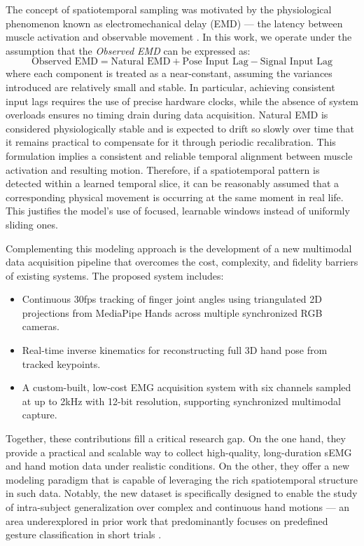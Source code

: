 The concept of spatiotemporal sampling was motivated by the physiological phenomenon known as electromechanical delay (EMD) — the latency between muscle activation and observable movement \cite{ngeo2014continuous}. In this work, we operate under the assumption that the \textit{Observed EMD} can be expressed as:
\[
\text{Observed EMD} = \text{Natural EMD} + \text{Pose Input Lag} - \text{Signal Input Lag}
\]
where each component is treated as a near-constant, assuming the variances introduced are relatively small and stable. In particular, achieving consistent input lags requires the use of precise hardware clocks, while the absence of system overloads ensures no timing drain during data acquisition. Natural EMD is considered physiologically stable and is expected to drift so slowly over time that it remains practical to compensate for it through periodic recalibration. This formulation implies a consistent and reliable temporal alignment between muscle activation and resulting motion. Therefore, if a spatiotemporal pattern is detected within a learned temporal slice, it can be reasonably assumed that a corresponding physical movement is occurring at the same moment in real life. This justifies the model's use of focused, learnable windows instead of uniformly sliding ones.

Complementing this modeling approach is the development of a new multimodal data acquisition pipeline that overcomes the cost, complexity, and fidelity barriers of existing systems. The proposed system includes:
\begin{itemize}
    \item Continuous 30fps tracking of finger joint angles using triangulated 2D projections from MediaPipe Hands across multiple synchronized RGB cameras.
    \item Real-time inverse kinematics for reconstructing full 3D hand pose from tracked keypoints.
    \item A custom-built, low-cost EMG acquisition system with six channels sampled at up to 2kHz with 12-bit resolution, supporting synchronized multimodal capture.
\end{itemize}

Together, these contributions fill a critical research gap. On the one hand, they provide a practical and scalable way to collect high-quality, long-duration sEMG and hand motion data under realistic conditions. On the other, they offer a new modeling paradigm that is capable of leveraging the rich spatiotemporal structure in such data. Notably, the new dataset is specifically designed to enable the study of intra-subject generalization over complex and continuous hand motions — an area underexplored in prior work that predominantly focuses on predefined gesture classification in short trials \cite{salter2024emg2pose}.


